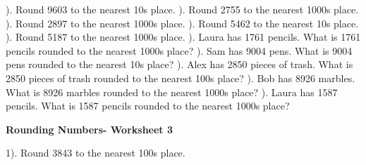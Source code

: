 \documentclass{article}%
\begin{document}
\newline%
\newline%
). Round 9603 to the nearest 10s place.%
\newline%
\newline%
). Round 2755 to the nearest 1000s place.%
\newline%
\newline%
). Round 2897 to the nearest 1000s place.%
\newline%
\newline%
). Round 5462 to the nearest 10s place.%
\newline%
\newline%
). Round 5187 to the nearest 1000s place.%
\newline%
\newline%
). Laura has 1761 pencils. What is 1761 pencils rounded to the nearest 1000s place?%
\newline%
\newline%
). Sam has 9004 pens. What is 9004 pens rounded to the nearest 10s place?%
\newline%
\newline%
). Alex has 2850 pieces of trash. What is 2850 pieces of trash rounded to the nearest 100s place?%
\newline%
\newline%
). Bob has 8926 marbles. What is 8926 marbles rounded to the nearest 1000s place?%
\newline%
\newline%
). Laura has 1587 pencils. What is 1587 pencils rounded to the nearest 1000s place?%
\newline%
\newline%
\newline%
\pagebreak%
\large%
\begin{center}%
\textbf{Rounding Numbers- Worksheet 3}%
\newline%
\end{center} \normalsize%
1). Round 3843 to the nearest 100s place.%
\newline%
\end{document}
